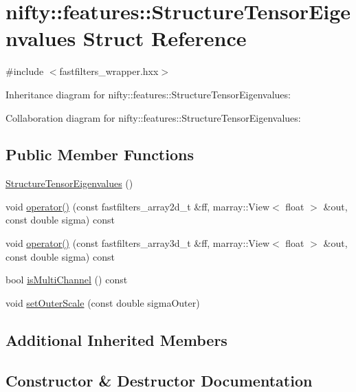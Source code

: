 \hypertarget{structnifty_1_1features_1_1StructureTensorEigenvalues}{}\section{nifty\+:\+:features\+:\+:Structure\+Tensor\+Eigenvalues Struct Reference}
\label{structnifty_1_1features_1_1StructureTensorEigenvalues}


{\ttfamily \#include $<$fastfilters\+\_\+wrapper.\+hxx$>$}



Inheritance diagram for nifty\+:\+:features\+:\+:Structure\+Tensor\+Eigenvalues\+:


Collaboration diagram for nifty\+:\+:features\+:\+:Structure\+Tensor\+Eigenvalues\+:
\subsection*{Public Member Functions}
\begin{DoxyCompactItemize}
\item 
\hyperlink{structnifty_1_1features_1_1StructureTensorEigenvalues_a9691bb7847cc244a100c566f20e7f4cd}{Structure\+Tensor\+Eigenvalues} ()
\item 
void \hyperlink{structnifty_1_1features_1_1StructureTensorEigenvalues_ab54e8f7c4d7105c12a4c3ae65123bc61}{operator()} (const fastfilters\+\_\+array2d\+\_\+t \&ff, marray\+::\+View$<$ float $>$ \&out, const double sigma) const 
\item 
void \hyperlink{structnifty_1_1features_1_1StructureTensorEigenvalues_a3bd67a952442dd5bd961e82e4f120c20}{operator()} (const fastfilters\+\_\+array3d\+\_\+t \&ff, marray\+::\+View$<$ float $>$ \&out, const double sigma) const 
\item 
bool \hyperlink{structnifty_1_1features_1_1StructureTensorEigenvalues_aa5167e0e2271ab52102d4afcb11d6634}{is\+Multi\+Channel} () const 
\item 
void \hyperlink{structnifty_1_1features_1_1StructureTensorEigenvalues_a55717fa81aee4a1faa8538be206a572f}{set\+Outer\+Scale} (const double sigma\+Outer)
\end{DoxyCompactItemize}
\subsection*{Additional Inherited Members}


\subsection{Constructor \& Destructor Documentation}
\hypertarget{structnifty_1_1features_1_1StructureTensorEigenvalues_a9691bb7847cc244a100c566f20e7f4cd}{}
